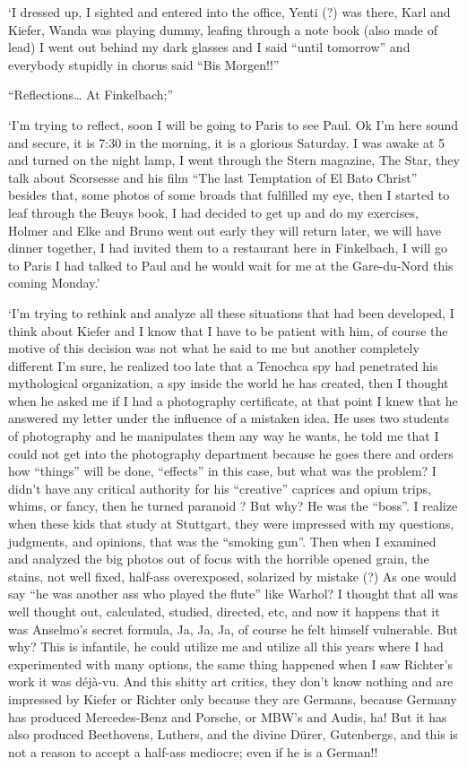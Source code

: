 \documentclass[smalldemyvopaper,11pt,twoside,onecolumn,openright,extrafontsizes]{memoir}
\begin{document}
‘I dressed up, I sighted and entered into the office, Yenti (?) was there, Karl and Kiefer, Wanda was playing dummy, leafing through a note book (also made of lead) I went out behind my dark glasses and I said “until tomorrow” and everybody stupidly in chorus said “Bis Morgen!!”

\ornamentbreak

“Reflections… At Finkelbach;”

‘I’m trying to reflect, soon I will be going to Paris to see Paul. Ok I’m here sound and secure, it is 7:30 in the morning, it is a glorious Saturday. I was awake at 5 and turned on the night lamp, I went through the Stern magazine, The Star, they talk about Scorsesse and his film “The last Temptation of El Bato Christ” besides that, some photos of some broads that fulfilled my eye, then I started to leaf through the Beuys book, I had decided to get up and do my exercises, Holmer and Elke and Bruno went out early they will return later, we will have dinner together, I had invited them to a restaurant here in Finkelbach, I will go to Paris I had talked to Paul and he would wait for me at the Gare-du-Nord this coming Monday.’

\ornamentbreak

‘I’m trying to rethink and analyze all these situations that had been developed, I think about Kiefer and I know that I have to be patient with him, of course the motive of this decision was not what he said to me but another completely different I’m sure, he realized too late that a Tenochca spy had penetrated his mythological organization, a spy inside the world he has created, then I thought when he asked me if I had a photography certificate, at that point I knew that he answered my letter under the influence of a mistaken idea. He uses two students of photography and he manipulates them any way he wants, he told me that I could not get into the photography department because he goes there and orders how “things” will be done, “effects” in this case, but what was the problem? I didn’t have any critical authority for his “creative” caprices and opium trips, whims, or fancy, then he turned paranoid ? But why? He was the “boss”. I realize when these kids that study at Stuttgart, they were impressed with my questions, judgments, and opinions, that was the “smoking gun”. Then when I examined and analyzed the big photos out of focus with the horrible opened grain, the stains, not well fixed, half-ass overexposed, solarized by mistake (?) As one would say “he was another ass who played the flute” like Warhol? I thought that all was well thought out, calculated, studied, directed, etc, and now it happens that it was Anselmo’s secret formula, Ja, Ja, Ja, of course he felt himself vulnerable. But why? This is infantile, he could utilize me and utilize all this years where I had experimented with many options, the same thing happened when I saw Richter’s work it was déjà-vu. And this shitty art critics, they don’t know nothing and are impressed by Kiefer or Richter only because they are Germans, because Germany has produced Mercedes-Benz and Porsche, or MBW’s and Audis, ha! But it has also produced Beethovens, Luthers, and the divine Dürer, Gutenbergs, and this is not a reason to accept a half-ass mediocre; even if he is a German!!
\end{document}
